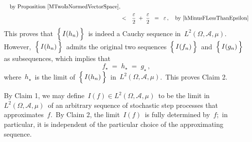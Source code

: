 \begin{enumerate}
\begin{eqnarray*}
		\quad
		\textnormal{by Proposition \ref{MTwoIsNormedVectorSpace}},
	\\
	& \overset{{\color{white}1}}{<} &
		\dfrac{\varepsilon}{2} \; + \; \dfrac{\varepsilon}{2}
	\;\; = \;\; \varepsilon\,,
		\quad
		\textnormal{by \eqref{hMinusFLessThanEpsilon}}
	\end{eqnarray*}
	This proves that \,$\left\{\,\overset{{\color{white}.}}{I(h_{n})}\,\right\}$\,
	is indeed a Cauchy sequence in \,$L^{2}(\Omega,\mathcal{A},\mu)$.
	However,
	\,$\left\{\,\overset{{\color{white}.}}{I(h_{n})}\,\right\}$\,
	admits the original two sequences
	\,$\left\{\,\overset{{\color{white}.}}{I(f_{n})}\,\right\}$\,
	and
	\,$\left\{\,\overset{{\color{white}.}}{I(g_{n})}\,\right\}$\,
	as subsequences, which implies that
	\begin{equation*}
	f_{\star} \; = \; h_{\star} \; = \; g_{\star}\,,
	\end{equation*}
	where \,$h_{\star}$\, is the limit of
	\,$\left\{\,\overset{{\color{white}.}}{I(h_{n})}\,\right\}$\,
	in \,$L^{2}(\Omega,\mathcal{A},\mu)$.\,
	This proves Claim 2.
	
	\vskip 0.5cm
	\noindent
	By Claim 1, we may define \,$I(f) \in L^{2}(\Omega,\mathcal{A},\mu)$\,
	to be the limit in \,$L^{2}(\Omega,\mathcal{A},\mu)$\, of an arbitrary
	sequence of stochastic step processes that approximates \,$f$.\,
	By Claim 2, the limit \,$I(f)$\, is fully determined by \,$f$;\, in particular,
	it is independent of the particular choice of the approximating sequence.


\end{enumerate}
